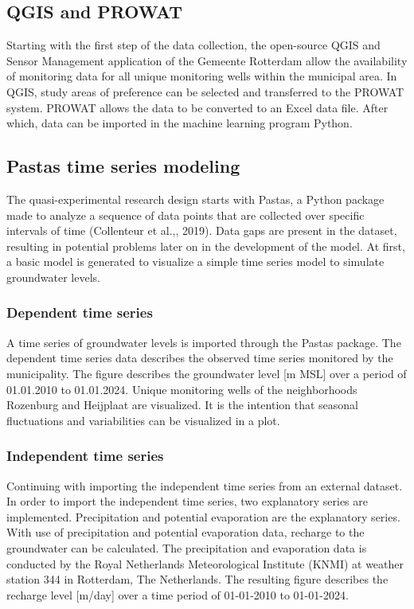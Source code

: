 \subsection{QGIS and PROWAT}
Starting with the first step of the data collection, the open-source QGIS and Sensor Management application of the Gemeente Rotterdam allow the availability of monitoring data for all unique monitoring wells within the municipal area. In QGIS, study areas of preference can be selected and transferred to the PROWAT system. PROWAT allows the data to be converted to an Excel data file. After which, data can be imported in the machine learning program Python.

\subsection{Pastas time series modeling}
The quasi-experimental research design starts with Pastas, a Python package made to analyze a sequence of data points that are collected over specific intervals of time (Collenteur et al.,, 2019). Data gaps are present in the dataset, resulting in potential problems later on in the development of the model. At first, a basic model is generated to visualize a simple time series model to simulate groundwater levels.

\subsubsection{Dependent time series}
A time series of groundwater levels is imported through the Pastas package. The dependent time series data describes the observed time series monitored by the municipality. The figure describes the groundwater level [m MSL] over a period of 01.01.2010 to 01.01.2024. Unique monitoring wells of the neighborhoods Rozenburg and Heijplaat are visualized. It is the intention that seasonal fluctuations and variabilities can be visualized in a plot. 

\subsubsection{Independent time series}
Continuing with importing the independent time series from an external dataset. In order to import the independent time series, two explanatory series are implemented. Precipitation and potential evaporation are the explanatory series. With use of precipitation and potential evaporation data, recharge to the groundwater can be calculated. The precipitation and evaporation data is conducted by the Royal Netherlands Meteorological Institute (KNMI) at weather station 344 in Rotterdam, The Netherlands. The resulting figure describes the recharge level [m/day] over a time period of 01-01-2010 to 01-01-2024.

